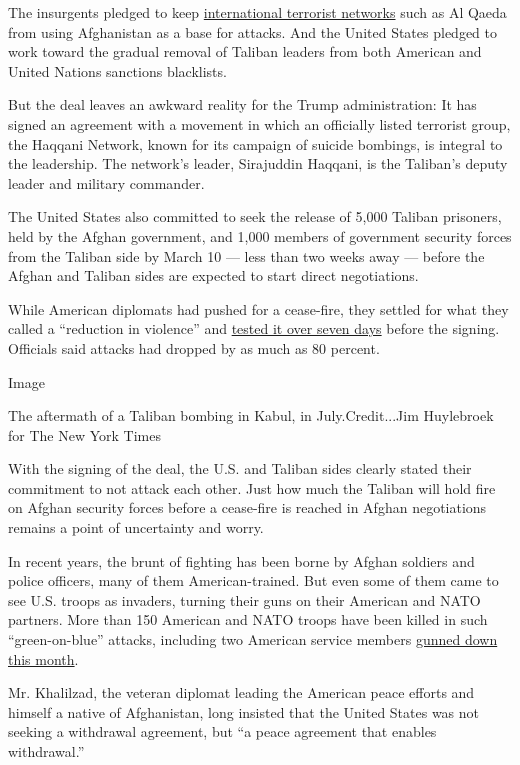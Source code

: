 The insurgents pledged to keep
\href{https://www.nytimes.com/2019/03/07/world/asia/taliban-peace-talks-afghanistan.html}{international
terrorist networks} such as Al Qaeda from using Afghanistan as a base
for attacks. And the United States pledged to work toward the gradual
removal of Taliban leaders from both American and United Nations
sanctions blacklists.

But the deal leaves an awkward reality for the Trump administration: It
has signed an agreement with a movement in which an officially listed
terrorist group, the Haqqani Network, known for its campaign of suicide
bombings, is integral to the leadership. The network's leader,
Sirajuddin Haqqani, is the Taliban's deputy leader and military
commander.

The United States also committed to seek the release of 5,000 Taliban
prisoners, held by the Afghan government, and 1,000 members of
government security forces from the Taliban side by March 10 --- less
than two weeks away --- before the Afghan and Taliban sides are expected
to start direct negotiations.

While American diplomats had pushed for a cease-fire, they settled for
what they called a ``reduction in violence'' and
\href{https://www.nytimes.com/2020/02/27/world/asia/afghanistan-taliban-peace.html}{tested
it over seven days} before the signing. Officials said attacks had
dropped by as much as 80 percent.

Image

The aftermath of a Taliban bombing in Kabul, in July.Credit...Jim
Huylebroek for The New York Times

With the signing of the deal, the U.S. and Taliban sides clearly stated
their commitment to not attack each other. Just how much the Taliban
will hold fire on Afghan security forces before a cease-fire is reached
in Afghan negotiations remains a point of uncertainty and worry.

In recent years, the brunt of fighting has been borne by Afghan soldiers
and police officers, many of them American-trained. But even some of
them came to see U.S. troops as invaders, turning their guns on their
American and NATO partners. More than 150 American and NATO troops have
been killed in such ``green-on-blue'' attacks, including two American
service members
\href{https://www.nytimes.com/2020/02/17/world/asia/afghanistan-peace-american-deaths.html}{gunned
down this month}.

Mr. Khalilzad, the veteran diplomat leading the American peace efforts
and himself a native of Afghanistan, long insisted that the United
States was not seeking a withdrawal agreement, but ``a peace agreement
that enables withdrawal.''

